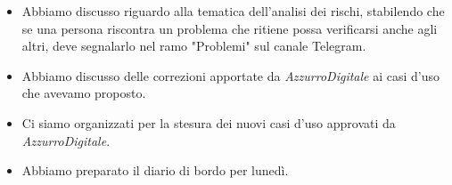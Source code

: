 \begin{itemize}
    \item Abbiamo discusso riguardo alla tematica dell'analisi dei rischi, stabilendo che se una persona riscontra un problema che ritiene possa verificarsi anche agli altri, deve segnalarlo nel ramo "Problemi" sul canale Telegram.
    \item Abbiamo discusso delle correzioni apportate da \emph{AzzurroDigitale} ai casi d'uso che avevamo proposto.
    \item Ci siamo organizzati per la stesura dei nuovi casi d'uso approvati da \emph{AzzurroDigitale}.
    \item Abbiamo preparato il diario di bordo per lunedì.
\end{itemize}
